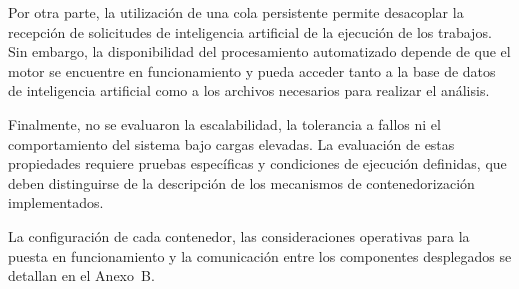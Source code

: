Por otra parte, la utilización de una cola persistente
permite desacoplar la recepción de solicitudes de
inteligencia artificial de la ejecución de los trabajos.
Sin embargo, la disponibilidad del procesamiento
automatizado depende de que el motor se encuentre en
funcionamiento y pueda acceder tanto a la base de datos
de inteligencia artificial como a los archivos necesarios
para realizar el análisis.

Finalmente, no se evaluaron la escalabilidad, la tolerancia
a fallos ni el comportamiento del sistema bajo cargas elevadas.
La evaluación de estas propiedades requiere pruebas
específicas y condiciones de ejecución definidas,
que deben distinguirse de la descripción de los
mecanismos de contenedorización implementados.

\begin{nuevotexto}
La configuración de cada contenedor, las consideraciones operativas para la puesta en funcionamiento y la comunicación entre los componentes desplegados se detallan en el Anexo~B.
\end{nuevotexto}

